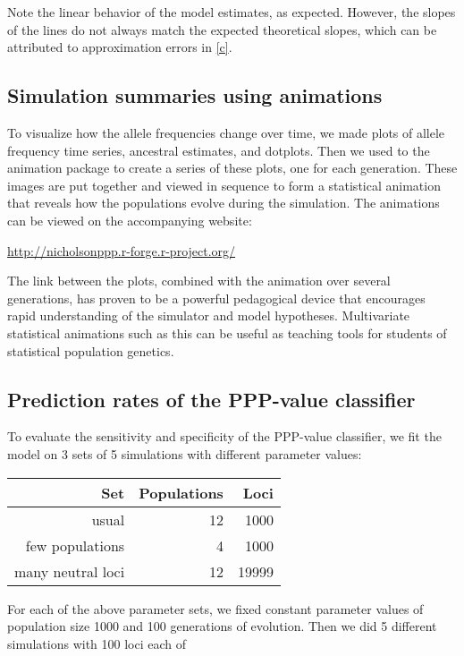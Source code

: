 \documentclass[a4paper,12pt]{article}
\begin{document}
Note the linear behavior of the model estimates, as expected. However,
the slopes of the lines do not always match the expected theoretical
slopes, which can be attributed to approximation errors in
\autoref{c}.

\subsection{Simulation summaries using animations}

To visualize how the allele frequencies change over time, we made
plots of allele frequency time series, ancestral estimates, and
dotplots. Then we used to the animation package \cite{animation} to
create a series of these plots, one for each generation. These images
are put together and viewed in sequence to form a statistical
animation that reveals how the populations evolve during the
simulation. The animations can be viewed on the accompanying website:

\url{http://nicholsonppp.r-forge.r-project.org/}

The link between the plots, combined with the animation over several
generations, has proven to be a powerful pedagogical device that
encourages rapid understanding of the simulator and model
hypotheses. Multivariate statistical animations such as this can be
useful as teaching tools for students of statistical population
genetics.

\subsection{Prediction rates of the PPP-value classifier}

To evaluate the sensitivity and specificity of the PPP-value
classifier, we fit the model on 3 sets of 5 simulations with different
parameter values:

\begin{center}
\begin{tabular}{rrr}
  Set & Populations & Loci \\
  \hline
  usual & 12 & 1000 \\ %
  few populations & 4 & 1000\\   %
  many neutral loci & 12 & 19999   %
\end{tabular}
\end{center}

For each of the above parameter sets, we fixed constant parameter
values of population size 1000 and 100 generations of evolution. Then
we did 5 different simulations with 100 loci each of
\end{document}
